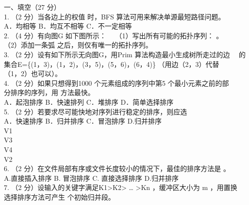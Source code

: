 
\begin{question}
一、填空（27 分）\\
1. （2 分）当各边上的权值 \underline{\hspace{2em}} 时，BFS 算法可用来解决单源最短路径问题。\\
A．均相等        B．均互不相等      C．不一定相等\\
2. （4 分）有向图G 如下图所示：\
\
（1）写出所有可能的拓扑序列： \underline{\hspace{8em}}。\\
（2）添加一条弧 \underline{\hspace{8em}} 之后，则仅有唯一的拓扑序列。\\
3. （2 分）设有如下所示无向图G，用Prim 算法构造最小生成树所走过的边\
\
的集合E=\{(1，3)，(1，2)，(3，5)，(5，6)，(6，4)\} （用边（2，3）代替\\
（1，2）也可以）。\\
4. （2 分）如果只想得到1000 个元素组成的序列中第5 个最小元素之前的部\\
分排序的序列，用 \underline{\hspace{2em}} 方法最快。\\
A．起泡排序   B．快速排列   C．堆排序  D．简单选择排序\\
5. （2 分）若要求尽可能快地对序列进行稳定的排序，则应选 \underline{\hspace{2em}}\\
A．快速排序       B．归并排序       C．冒泡排序       D.归并排序\\
V1\\
V3\\
V4\\
V2\\
6. （2 分）在文件局部有序或文件长度较小的情况下，最佳的排序方法是 \underline{\hspace{2em}}。\\
A.直接插入排序    B. 冒泡排序       C. 直接选择排序    D.归并排序\\
7. （2 分）设输入的关键字满足K1>K2> … >Kn ，缓冲区大小为 m ，用置换\\
选择排序方法可产生 \underline{\hspace{4em}} 个初始归并段。\\

\end{question}
